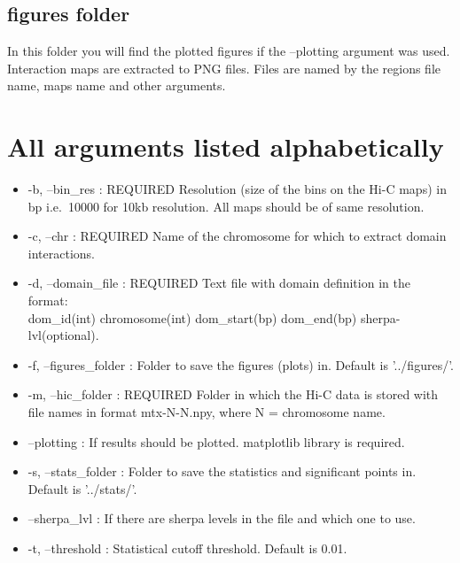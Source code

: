 \subsection{figures folder}
In this folder you will find the plotted figures if the --plotting argument was used. Interaction maps are
extracted to PNG files. Files are named by the regions file name, maps name and other arguments.

\section{All arguments listed alphabetically}
\label{sec:arguments2}
\begin{itemize}
    \item -b, --bin\_res : REQUIRED Resolution (size of the bins on the Hi-C maps) in bp i.e.~10000 for 10kb resolution.
All maps should be of same resolution.
\item -c, --chr : REQUIRED Name of the chromosome for which to extract domain interactions.
    \item -d, --domain\_file : REQUIRED Text file with domain definition in the format: \\
    dom\_id(int) chromosome(int) dom\_start(bp) dom\_end(bp) sherpa-lvl(optional). %
    \item -f, --figures\_folder : Folder to save the figures (plots) in. Default is '../figures/'.
    \item -m, --hic\_folder : REQUIRED Folder in which the Hi-C data is stored with file names in format mtx-N-N.npy, where
N = chromosome name.
\item --plotting : If results should be plotted. matplotlib library is required.
    \item -s, --stats\_folder : Folder to save the statistics and significant points in. Default is '../stats/'.
    \item --sherpa\_lvl : If there are sherpa levels in the file and which one to use.
\item -t, --threshold :  Statistical cutoff threshold. Default is 0.01.
\end{itemize}




